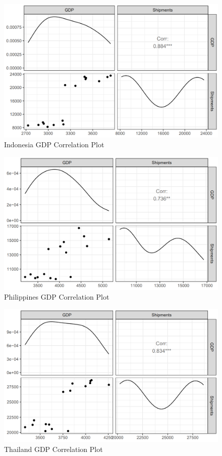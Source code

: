 \documentclass{article}
\begin{document}
\begin{figure}[H]
    \centering
    \includegraphics[width=1\textwidth]{images/Line Plots/Indonesia/Indonesia_Corrplot.png}
    \caption{Indonesia GDP Correlation Plot}
    \label{fig:my_label}
\end{figure}

\begin{figure}[H]
    \centering
    \includegraphics[width=1\textwidth]{images/Line Plots/Philippines/Philippines_Corrplot.png}
    \caption{Philippines GDP Correlation Plot}
    \label{fig:my_label}
\end{figure}

\begin{figure}[H]
    \centering
    \includegraphics[width=1\textwidth]{images/Line Plots/Thailand/Thailand_Corrplot.png}
    \caption{Thailand GDP Correlation Plot}
    \label{fig:my_label}
\end{figure}
\end{document}
